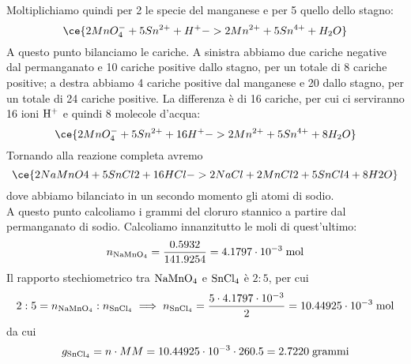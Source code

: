 \begin{soluzione}
\begin{equation*}
    \end{equation*}
    Moltiplichiamo quindi per 2 le specie del manganese e per 5 quello dello stagno:
    \begin{equation*}
        \ce{2MnO_4^- + 5Sn^{2+} + H^+ -> 2Mn^{2+} + 5Sn^{4+} + H_2O}
    \end{equation*}
    A questo punto bilanciamo le cariche. A sinistra abbiamo due cariche negative dal permanganato e 10 cariche positive dallo stagno, per un totale di 8 cariche positive; a destra abbiamo 4 cariche positive dal manganese e 20 dallo stagno, per un totale di 24 cariche positive. La differenza è di 16 cariche, per cui ci serviranno 16 ioni $\rm H^+$ e quindi 8 molecole d'acqua:
    \begin{equation*}
        \ce{2MnO_4^- + 5Sn^{2+} + 16H^+ -> 2Mn^{2+} + 5Sn^{4+} + 8H_2O}
    \end{equation*}
    Tornando alla reazione completa avremo
    \begin{equation*}
        \ce{2NaMnO4 + 5SnCl2 + 16HCl -> 2NaCl + 2MnCl2 + 5SnCl4 + 8H2O}
    \end{equation*}
    dove abbiamo bilanciato in un secondo momento gli atomi di sodio.\\
    A questo punto calcoliamo i grammi del cloruro stannico a partire dal permanganato di sodio. Calcoliamo innanzitutto le moli di quest'ultimo:
    \begin{equation*}
        n_{\rm NaMnO_4}
        =\frac{0.5932}{141.9254}
        =4.1797 \cdot 10^{-3} \; \rm mol
    \end{equation*}
    Il rapporto stechiometrico tra $\rm NaMnO_4$ e $\rm SnCl_4$ è $2:5$, per cui
    \begin{equation*}
        2:5=n_{\rm NaMnO_4}:n_{\rm SnCl_4}
        \implies
        n_{\rm SnCl_4}
        =\frac{5 \cdot 4.1797 \cdot 10^{-3}}{2}
        =10.44925 \cdot 10^{-3} \; \rm mol
    \end{equation*}
    da cui
    \begin{equation*}
        g_{\rm SnCl_4}
        =n \cdot MM
        =10.44925 \cdot 10^{-3} \cdot 260.5
        =2.7220 \; \rm grammi
    \end{equation*}
\end{soluzione}

\newpage

